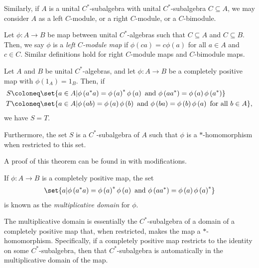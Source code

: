 Similarly, if $A$ is a unital $C^{\ast}$-subalgebra with unital $C^{\ast}$-subalgebra $C\subseteq A$, we may consider $A$ as a left $C$-module, or a right $C$-module, or a $C$-bimodule. 
\begin{definition}
  Let $\phi\colon A\rightarrow B$ be map between unital $C^{\ast}$-algebras such that $C\subseteq A$ and $C\subseteq B$. Then, we say $\phi$ is a \textit{left $C$-module map} if $\phi\left( ca \right) = c\phi\left( a \right)$ for all $a\in A$ and $c\in C$. Similar definitions hold for right $C$-module maps and $C$-bimodule maps.
\end{definition}
\begin{theorem}\label{thm:preview_multiplicative_domain}
  Let $A$ and $B$ be unital $C^{\ast}$-algebras, and let $\phi\colon A\rightarrow B$ be a completely positive map with $\phi\left(1_A\right) = 1_B$. Then, if
  \begin{align*}
    S &\coloneq\set{a\in A | \phi\left( a^{\ast}a \right) = \phi\left( a \right)^{\ast}\phi\left( a \right)\text{ and }\phi\left( aa^{\ast} \right) = \phi\left( a \right)\phi\left( a^{\ast} \right)}\\
      T&\coloneq \set{a\in A | \phi\left( ab \right) = \phi\left( a \right)\phi\left( b \right)\text{ and }\phi\left( ba \right) = \phi\left( b \right)\phi\left( a \right)\text{ for all }b\in A},
  \end{align*}
  we have $S = T$.\newline

  Furthermore, the set $S$ is a $C^{\ast}$-subalgebra of $A$ such that $\phi$ is a $\ast$-homomorphism when restricted to this set.
\end{theorem}
A proof of this theorem can be found in \cite{completely_bounded_maps_and_operator_algebras} with modifications. 
\begin{definition}
  If $\phi\colon A\rightarrow B$ is a completely positive map, the set
  \begin{align*}
    \set{a | \phi\left( a^{\ast}a \right) = \phi\left( a \right)^{\ast}\phi\left( a \right)\text{ and }\phi\left( aa^{\ast} \right) = \phi\left( a \right)\phi\left( a \right)^{\ast}}
  \end{align*}
  is known as the \textit{multiplicative domain} for $\phi$.
\end{definition}
The multiplicative domain is essentially the $C^{\ast}$-subalgebra of a domain of a completely positive map that, when restricted, makes the map a $\ast$-homomorphism. Specifically, if a completely positive map restricts to the identity on some $C^{\ast}$-subalgebra, then that $C^{\ast}$-subalgebra is automatically in the multiplicative domain of the map.
